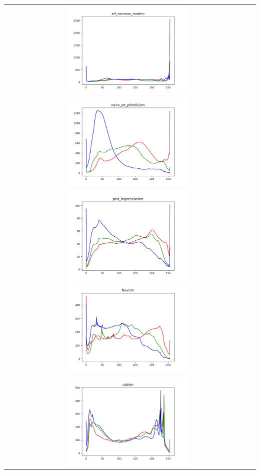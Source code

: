 \documentclass{article}
\begin{document}
\begin{center}
\begin{tabular}{cc}
				\noindent
				\includegraphics[width=0.5\textwidth]{plots/art_nouveau_modern.png}
				\includegraphics[width=0.5\textwidth]{plots/naive_art_primitivism.png}\\[2em]
				\includegraphics[width=0.5\textwidth]{plots/post_impressionism.png}
				\includegraphics[width=0.5\textwidth]{plots/fauvism.png}\\[2em]
				\includegraphics[width=0.5\textwidth]{plots/cubism.png}

\end{tabular}
\end{center}
\end{document}
